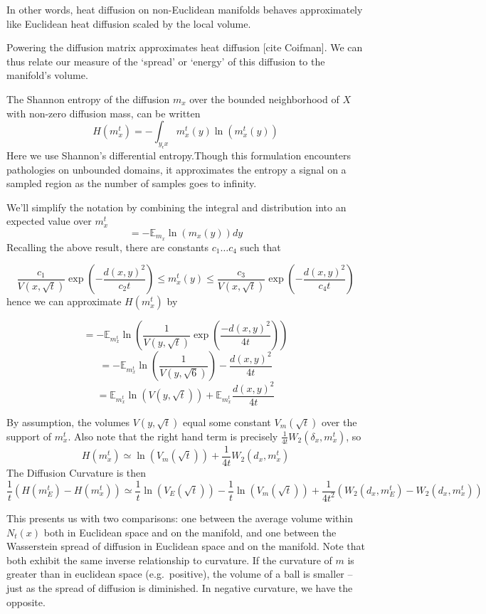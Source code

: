 \documentclass[
  letterpaper,
  DIV=11,
  numbers=noendperiod]{scrartcl}
\theoremstyle{plain}
\theoremstyle{plain}
\theoremstyle{definition}
\theoremstyle{plain}
\theoremstyle{definition}
\theoremstyle{plain}
\theoremstyle{remark}
\begin{document}
In other words, heat diffusion on non-Euclidean manifolds behaves
approximately like Euclidean heat diffusion scaled by the local volume.

Powering the diffusion matrix approximates heat diffusion {[}cite
Coifman{]}. We can thus relate our measure of the `spread' or `energy'
of this diffusion to the manifold's volume.

The Shannon entropy of the diffusion \(m_{x}\) over the bounded
neighborhood of \(X\) with non-zero diffusion mass, can be written \[
H\left(m_x^t\right)=-\int_{y_\epsilon x} m_x^t(y) \ln \left(m_x^t(y)\right)
\] Here we use Shannon's differential entropy.Though this formulation
encounters pathologies on unbounded domains, it approximates the entropy
a signal on a sampled region as the number of samples goes to infinity.

We'll simplify the notation by combining the integral and distribution
into an expected value over \(m_{x}^t\) \[
=-\mathbb{E}_{m_x} \ln \left(m_x(y)\right) d y
\] Recalling the above result, there are constants \(c_{1}\dots c_{4}\)
such that

\[
\frac{c_1}{V(x, \sqrt{t})} \exp \left(-\frac{d(x, y)^2}{c_2 t}\right) \leq m_{x}^t(y) \leq \frac{c_3}{V(x, \sqrt{t})} \exp \left(-\frac{d(x, y)^2}{c_4 t}\right)
\] hence we can approximate \(H(m_{x}^t)\) by

\[
=-\mathbb{E}_{m_{x}^t} \ln \left(\frac{1}{V(y, \sqrt{t})} \exp \left(\frac{-d(x, y)^2}{4 t}\right)\right)
\] \[
=-\mathbb{E}_{m_x^t} \ln \left(\frac{1}{V(y, \sqrt{6})}\right)-\frac{d(x, y)^2}{4 t}
\] \[
=\mathbb{E}_{m_x^t} \ln (V(y, \sqrt{t}))+\mathbb{E}_{m_{x}^t} \frac{d(x, y)^2}{4 t}
\]

By assumption, the volumes \(V(y,\sqrt{ t })\) equal some constant
\(V_{m}(\sqrt{ t })\) over the support of \(m_{x}^t\). Also note that
the right hand term is precisely
\(\frac{1}{4t}W_{2}(\delta_{x}, m_{x}^t)\), so \[
H(m_{x}^t) \simeq \ln(V_{m}(\sqrt{ t })) + \frac{1}{4t}W_{2}(d_{x},m_{x}^t)
\] The Diffusion Curvature is then \[
\frac{1}{t}(H(m_{E}^t) - H(m_{x}^t)) \simeq \frac{1}{t}\ln(V_{E}(\sqrt{ t })) - \frac{1}{t}\ln(V_{m}(\sqrt{ t })) + \frac{1}{4t^2}( W_{2}(d_{x},m_{E}^t) - W_{2}(d_{x},m_{x}^t))
\]

This presents us with two comparisons: one between the average volume
within \(N_{t}(x)\) both in Euclidean space and on the manifold, and one
between the Wasserstein spread of diffusion in Euclidean space and on
the manifold. Note that both exhibit the same inverse relationship to
curvature. If the curvature of \(m\) is greater than in euclidean space
(e.g.~positive), the volume of a ball is smaller -- just as the spread
of diffusion is diminished. In negative curvature, we have the opposite.
\end{document}
